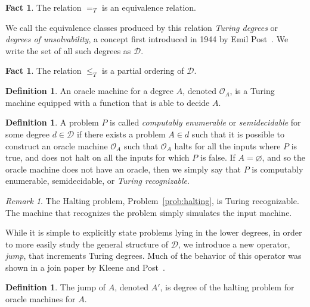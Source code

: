 \documentclass[psamsfonts]{amsart}
\theoremstyle{definition}
\newtheorem{defn}[thm]{Definition}
\newtheorem{fact}[thm]{Fact}
\theoremstyle{remark}
\newtheorem{rem}[thm]{Remark}
\numberwithin{equation}{section}
\begin{document}
\begin{fact}
  The relation $=_T$ is an equivalence relation.
\end{fact}

We call the equivalence classes produced by this relation \emph{Turing degrees}
or \emph{degrees of unsolvability}, a concept first introduced in
1944 by Emil Post~\cite{post44:_recur}. We write the set of all such degrees as $\mathcal{D}$.

\begin{fact}
  The relation $\leq_T$ is a partial ordering of $\mathcal{D}$.
\end{fact}

\begin{defn}
  \label{defn:oracle}
  An oracle machine for a degree $A$, denoted $\mathcal{O}_A$, is a Turing
  machine equipped with a function that is able to decide $A$.
\end{defn}

\begin{defn}
  A problem $P$ is called \emph{computably enumerable} or \emph{semidecidable}
  for some degree $d\in\mathcal{D}$ if there exists a problem $A\in d$ such that
  it is possible to construct an oracle machine $\mathcal{O}_A$ such that
  $\mathcal{O}_A$ halts for all the inputs where $P$ is true, and does not halt
  on all the inputs for which $P$ is false. If $A=\varnothing$, and so the
  oracle machine does not have an oracle, then we simply say that $P$ is
  computably enumerable, semidecidable, or \emph{Turing recognizable}.
\end{defn}
\begin{rem}
  The Halting problem, Problem~\ref{prob:halting}, is Turing recognizable. The
  machine that recognizes the problem simply simulates the input machine.
\end{rem}

While it is simple to explicitly state problems lying in the lower degrees,
in order to more easily study the general structure of $\mathcal{D}$, we
introduce a new operator, \emph{jump}, that increments Turing degrees. Much of
the behavior of this operator was shown in a join paper by Kleene and Post~\cite{kleene54_upper_semi_lattic_degrees_recur_unsol}.

\begin{defn}
  The jump of $A$, denoted $A'$, is degree of the halting problem for oracle
  machines for $A$.
\end{defn}
\end{document}
